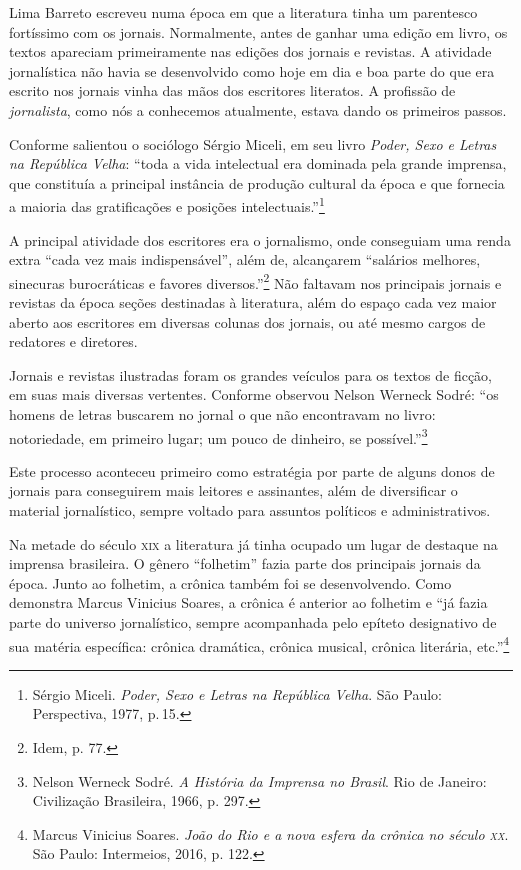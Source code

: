 \documentclass{extarticle}
\begin{document}
Lima Barreto escreveu numa época em que a literatura tinha um parentesco
fortíssimo com os jornais. Normalmente, antes de ganhar uma edição em
livro, os textos apareciam primeiramente nas edições dos jornais e
revistas. A atividade jornalística não havia se desenvolvido como hoje
em dia e boa parte do que era escrito nos jornais vinha das mãos dos
escritores literatos. A profissão de \emph{jornalista}, como nós a
conhecemos atualmente, estava dando os primeiros passos.

Conforme salientou o sociólogo Sérgio Miceli, em seu livro \emph{Poder,
Sexo e Letras na República Velha}: ``toda a vida intelectual era
dominada pela grande imprensa, que constituía a principal instância de
produção cultural da época e que fornecia a maioria das gratificações e
posições intelectuais.''\footnote{Sérgio Miceli. \emph{Poder, Sexo e
  Letras na República Velha}. São Paulo: Perspectiva, 1977, p.\,15.}

A principal atividade dos escritores era o jornalismo, onde conseguiam
uma renda extra ``cada vez mais indispensável'', além de, alcançarem
``salários melhores, sinecuras burocráticas e favores
diversos.''\footnote{Idem, p. 77.} Não faltavam nos principais jornais e
revistas da época seções destinadas à literatura, além do espaço cada
vez maior aberto aos escritores em diversas colunas dos jornais, ou até
mesmo cargos de redatores e diretores.

Jornais e revistas ilustradas foram os grandes veículos para os textos
de ficção, em suas mais diversas vertentes. Conforme observou Nelson
Werneck Sodré: ``os homens de letras buscarem no jornal o que não
encontravam no livro: notoriedade, em primeiro lugar; um pouco de
dinheiro, se possível.''\footnote{Nelson Werneck Sodré. \emph{A História
  da Imprensa no Brasil}. Rio de Janeiro: Civilização Brasileira, 1966,
  p. 297.}

Este processo aconteceu primeiro como estratégia por parte de alguns
donos de jornais para conseguirem mais leitores e assinantes, além de
diversificar o material jornalístico, sempre voltado para assuntos
políticos e administrativos.

Na metade do século \textsc{xix} a literatura já tinha ocupado um lugar de
destaque na imprensa brasileira. O gênero ``folhetim'' fazia parte dos
principais jornais da época. Junto ao folhetim, a crônica também foi se
desenvolvendo. Como demonstra Marcus Vinicius Soares, a crônica é
anterior ao folhetim e ``já fazia parte do universo jornalístico, sempre
acompanhada pelo epíteto designativo de sua matéria específica: crônica
dramática, crônica musical, crônica literária, etc.''\footnote{Marcus
  Vinicius Soares. \emph{João do Rio e a nova esfera da crônica no
  século \textsc{xx}}. São Paulo: Intermeios, 2016, p. 122.}
\end{document}
